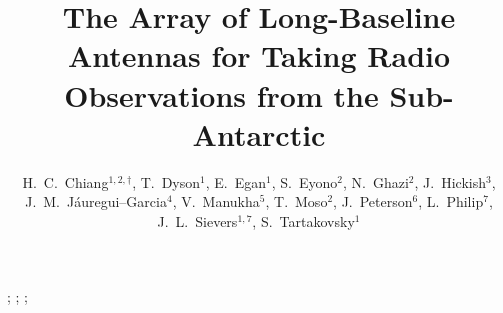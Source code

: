 \documentclass{ws-jai}
\begin{document}
\catchline{}{}{}{}{} %


\title{The Array of Long-Baseline Antennas for Taking Radio
  Observations from the Sub-Antarctic}

\author{H.~C.~Chiang$^{1,2,\dagger}$, T.~Dyson$^{1}$, E.~Egan$^{1}$,
  S.~Eyono$^{2}$, N.~Ghazi$^{2}$, J.~Hickish$^{3}$,
  J.~M.~J\'auregui--Garcia$^{4}$, V.~Manukha$^{5}$, T.~Moso$^{2}$,
  J.~Peterson$^{6}$, L.~Philip$^{7}$, J.~L.~Sievers$^{1,7}$,
  S.~Tartakovsky$^{1}$}

\address{
$^{1}$Department of Physics, McGill University, Montr\'eal, Quebec H3A 2T8, Canada\\
$^{2}$School of Mathematics, Statistics, and Computer Science,
  University of KwaZulu--Natal, Durban 4000, South Africa\\
$^{3}$Department of Astronomy, University of California, Berkeley,
  California 94720, USA\\
$^{4}$Canadian Institute for Theoretical Astrophysics, Toronto, Ontario M5R 2M8, Canada \\
$^{5}$South African National Space Agency, Hermanus 7200, South Africa\\
$^{6}$Department of Physics, Carnegie Mellon University,
  Pittsburgh, Pennsylvania 15213, USA\\
$^{7}$School of Chemistry and Physics,
  University of KwaZulu--Natal, Durban 4000, South Africa
}

\maketitle


\begin{history}
;
;
;
\end{history}
\end{document}
